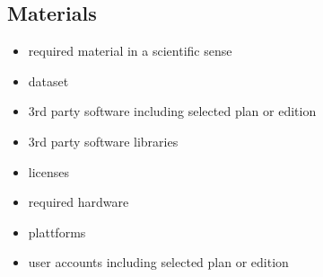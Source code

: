 \subsection{Materials}

\begin{itemize}
    \item required material in a scientific sense
    \item dataset
    \item 3rd party software including selected plan or edition
    \item 3rd party software libraries
    \item licenses
    \item required hardware
    \item plattforms
    \item user accounts including selected plan or edition
\end{itemize}

